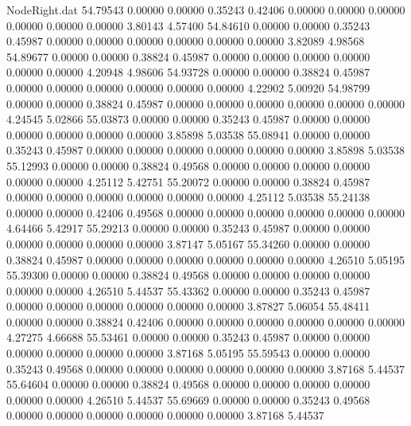 \begin{filecontents}{NodeRight.dat}
  54.79543    0.00000    0.00000     0.35243    0.42406    0.00000    0.00000    0.00000    0.00000    0.00000    0.00000    3.80143    4.57400
  54.84610    0.00000    0.00000     0.35243    0.45987    0.00000    0.00000    0.00000    0.00000    0.00000    0.00000    3.82089    4.98568
  54.89677    0.00000    0.00000     0.38824    0.45987    0.00000    0.00000    0.00000    0.00000    0.00000    0.00000    4.20948    4.98606
  54.93728    0.00000    0.00000     0.38824    0.45987    0.00000    0.00000    0.00000    0.00000    0.00000    0.00000    4.22902    5.00920
  54.98799    0.00000    0.00000     0.38824    0.45987    0.00000    0.00000    0.00000    0.00000    0.00000    0.00000    4.24545    5.02866
  55.03873    0.00000    0.00000     0.35243    0.45987    0.00000    0.00000    0.00000    0.00000    0.00000    0.00000    3.85898    5.03538
  55.08941    0.00000    0.00000     0.35243    0.45987    0.00000    0.00000    0.00000    0.00000    0.00000    0.00000    3.85898    5.03538
  55.12993    0.00000    0.00000     0.38824    0.49568    0.00000    0.00000    0.00000    0.00000    0.00000    0.00000    4.25112    5.42751
  55.20072    0.00000    0.00000     0.38824    0.45987    0.00000    0.00000    0.00000    0.00000    0.00000    0.00000    4.25112    5.03538
  55.24138    0.00000    0.00000     0.42406    0.49568    0.00000    0.00000    0.00000    0.00000    0.00000    0.00000    4.64466    5.42917
  55.29213    0.00000    0.00000     0.35243    0.45987    0.00000    0.00000    0.00000    0.00000    0.00000    0.00000    3.87147    5.05167
  55.34260    0.00000    0.00000     0.38824    0.45987    0.00000    0.00000    0.00000    0.00000    0.00000    0.00000    4.26510    5.05195
  55.39300    0.00000    0.00000     0.38824    0.49568    0.00000    0.00000    0.00000    0.00000    0.00000    0.00000    4.26510    5.44537
  55.43362    0.00000    0.00000     0.35243    0.45987    0.00000    0.00000    0.00000    0.00000    0.00000    0.00000    3.87827    5.06054
  55.48411    0.00000    0.00000     0.38824    0.42406    0.00000    0.00000    0.00000    0.00000    0.00000    0.00000    4.27275    4.66688
  55.53461    0.00000    0.00000     0.35243    0.45987    0.00000    0.00000    0.00000    0.00000    0.00000    0.00000    3.87168    5.05195
  55.59543    0.00000    0.00000     0.35243    0.49568    0.00000    0.00000    0.00000    0.00000    0.00000    0.00000    3.87168    5.44537
  55.64604    0.00000    0.00000     0.38824    0.49568    0.00000    0.00000    0.00000    0.00000    0.00000    0.00000    4.26510    5.44537
  55.69669    0.00000    0.00000     0.35243    0.49568    0.00000    0.00000    0.00000    0.00000    0.00000    0.00000    3.87168    5.44537

\end{filecontents}
